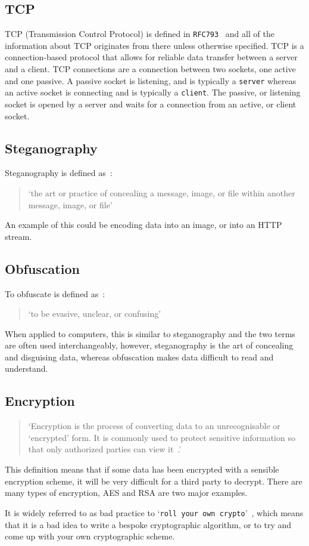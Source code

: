 \subsection{TCP}
TCP (Transmission Control Protocol) is defined in \texttt{RFC793}~\cite{rfc793} and all of the information about TCP originates from there unless otherwise specified.
TCP is a connection-based protocol that allows for reliable data transfer between a server and a client.
TCP connections are a connection between two sockets, one active and one passive.
A passive socket is listening, and is typically a \texttt{server} whereas an active socket is connecting and is typically a \texttt{client}.
The passive, or listening socket is opened by a server and waits for a connection from an active, or client socket.

\subsection{Steganography}
Steganography is defined as~\cite{dictsteno}:
\begin{quotation}
    `the art or practice of concealing a message, image, or file within
    another message, image, or file'
\end{quotation}
An example of this could be encoding data into an image, or into an HTTP stream.

\subsection{Obfuscation}
To obfuscate is defined as~\cite{dictobfs}:
\begin{quotation}
     `to be evasive, unclear, or confusing'
\end{quotation}
When applied to computers, this is similar to steganography and the two terms are often used interchangeably, however, steganography is the art of concealing and disguising data, whereas obfuscation makes data difficult to read and understand. 

\subsection{Encryption}
\begin{quotation}
    `Encryption is the process of converting data to an unrecognisable or
    `encrypted' form. It is commonly used to protect sensitive
    information so that only authorized parties can view it~\cite{dictenc}.'
\end{quotation}
This definition means that if some data has been encrypted with a sensible encryption scheme, it will be very difficult for a third party to decrypt.
There are many types of encryption, AES and RSA are two major examples.\par
It is widely referred to as bad practice to `\texttt{roll your own crypto}'~\cite{memtocrypto}, which means that it is a bad idea to write a bespoke cryptographic algorithm, or to try and come up with your own cryptographic scheme.

